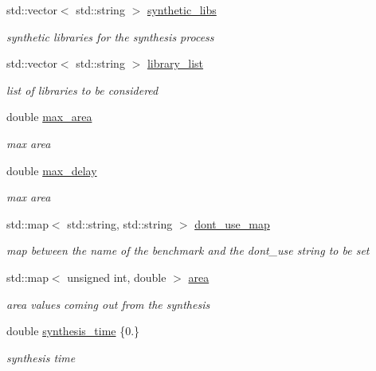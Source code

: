 \begin{DoxyCompactItemize}
std\+::vector$<$ std\+::string $>$ \hyperlink{classDesignCompilerWrapper_ab431580cc57f7b57555dd9b54ee08f11}{synthetic\+\_\+libs}
\begin{DoxyCompactList}\small\item\em synthetic libraries for the synthesis process \end{DoxyCompactList}\item 
std\+::vector$<$ std\+::string $>$ \hyperlink{classDesignCompilerWrapper_a329b4cc4b4110435c908e7bf30460a70}{library\+\_\+list}
\begin{DoxyCompactList}\small\item\em list of libraries to be considered \end{DoxyCompactList}\item 
double \hyperlink{classDesignCompilerWrapper_a7d3de54f0ae14f2791c4bf46fcd58c2e}{max\+\_\+area}
\begin{DoxyCompactList}\small\item\em max area \end{DoxyCompactList}\item 
double \hyperlink{classDesignCompilerWrapper_aa64fc1193764925488f6de9e8f671fd8}{max\+\_\+delay}
\begin{DoxyCompactList}\small\item\em max area \end{DoxyCompactList}\item 
std\+::map$<$ std\+::string, std\+::string $>$ \hyperlink{classDesignCompilerWrapper_a4539c1322e9140e3c228bf8d3fe28fff}{dont\+\_\+use\+\_\+map}
\begin{DoxyCompactList}\small\item\em map between the name of the benchmark and the dont\+\_\+use string to be set \end{DoxyCompactList}\item 
std\+::map$<$ unsigned int, double $>$ \hyperlink{classDesignCompilerWrapper_ab6cb68a1d47aca1be34d667cd09356ed}{area}
\begin{DoxyCompactList}\small\item\em area values coming out from the synthesis \end{DoxyCompactList}\item 
double \hyperlink{classDesignCompilerWrapper_a4e64fa4c3a0ea352f22aa1dd68228d4b}{synthesis\+\_\+time} \{0.\}
\begin{DoxyCompactList}\small\item\em synthesis time \end{DoxyCompactList}\item 

\end{DoxyCompactItemize}

